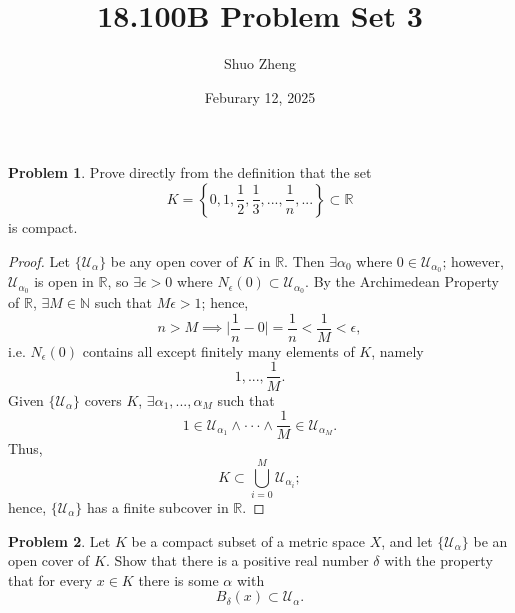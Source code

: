 \documentclass{amsart}
\title{18.100B Problem Set 3}
\author{Shuo Zheng}
\date{Feburary 12, 2025}
\theoremstyle{definition}
\newtheorem{problem}{Problem}
\begin{document}
\maketitle

\begin{problem}
Prove directly from the definition that the set
\[
K = \left\{0,1,\frac{1}{2},\frac{1}{3},...,\frac{1}{n},...\right\} \subset \mathbb{R}
\]
is compact.
\end{problem}

\begin{proof}
    Let $\{\mathcal{U}_{\alpha}\}$ be any open cover of $K$ in $\mathbb{R}$. Then $\exists \alpha_0$ where $0 \in \mathcal{U}_{\alpha_0}$; however, $\mathcal{U}_{\alpha_0}$ is open in $\mathbb{R}$, so $\exists \epsilon > 0$ where $N_{\epsilon}(0) \subset \mathcal{U}_{\alpha_0}$. By the Archimedean Property of $\mathbb{R}$, $\exists M \in \mathbb{N}$ such that $M\epsilon > 1$; hence,
    \[
    n > M \implies \bigg \vert \frac{1}{n} - 0 \bigg \vert = \frac{1}{n} < \frac{1}{M} < \epsilon,
    \]
    i.e. $N_{\epsilon}(0)$ contains all except finitely many elements of $K$, namely
    \[
    1,...,\frac{1}{M}.
    \]
    Given $\{\mathcal{U}_{\alpha}\}$ covers $K$, $\exists \alpha_1,...,\alpha_M$ such that 
    \[
    1 \in \mathcal{U}_{\alpha_1} \land \cdot \cdot \cdot \land \frac{1}{M} \in \mathcal{U}_{\alpha_M}.
    \]
    Thus, 
    \[
    K \subset \bigcup_{i=0}^{M}\mathcal{U}_{\alpha_i};
    \]
    hence, $\{\mathcal{U}_{\alpha}\}$ has a finite subcover in $\mathbb{R}$.
\end{proof}

\begin{problem}
    Let $K$ be a compact subset of a metric space $X$, and let $\{\mathcal{U}_{\alpha}\}$ be an open cover of $K$. Show that there is a positive real number $\delta$ with the property that for every $x \in K$ there is some $\alpha$ with
    \[
    B_{\delta}(x) \subset \mathcal{U}_{\alpha}.
    \]
\end{problem}
\end{document}
